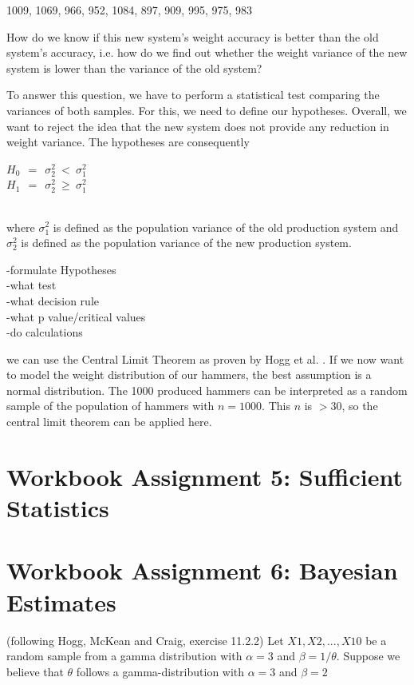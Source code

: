 \begin{center}
    1009, 1069, 966, 952, 1084, 897, 909, 995, 975, 983
\end{center}

How do we know if this new system's weight accuracy is better than the old system's accuracy, i.e. how do we find out whether the weight variance of the new system is lower than the variance of the old system?

To answer this question, we have to perform a statistical test comparing the variances of both samples. For this, we need to define our hypotheses. Overall, we want to reject the idea that the new system does not provide any reduction in weight variance. The hypotheses are consequently 
\\
\begin{center}
$H_0~~=~~ \sigma^2_2~<~\sigma^2_1$\\
$H_1~~=~~ \sigma^2_2~\geq~\sigma^2_1$
\end{center}
\\
where $\sigma^2_1$ is defined as the population variance of the old production system and $\sigma^2_2$ is defined as the population variance of the new production system.




-formulate Hypotheses\\
-what test\\
-what decision rule\\
-what p value/critical values\\
-do calculations




we can use the Central Limit Theorem as proven by Hogg et al. \cite[Theorem~5.3.1]{hogg}. 
If we now want to model the weight distribution of our hammers, the best assumption is a normal distribution. The 1000 produced hammers can be interpreted as a random sample of the population of hammers with $n = 1000$. This $n$ is $>30$, so the central limit theorem can be applied here. 


\chapter{Workbook Assignment 5: Sufficient Statistics}	
\chapter{Workbook Assignment 6: Bayesian Estimates}	

(following Hogg, McKean and Craig, exercise 11.2.2)
Let $X1, X2, ... , X10$ be a random sample from a gamma distribution with $\alpha =3$ and $\beta =1/\theta$. Suppose we believe that $\theta$ follows a gamma-distribution with $\alpha =3$ and $\beta = 2$

